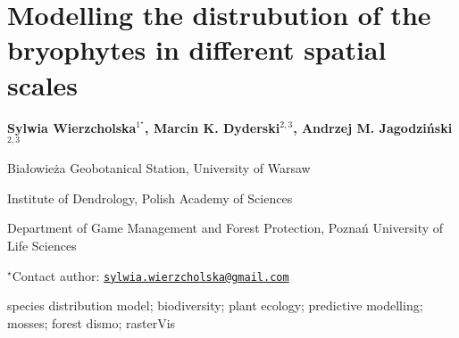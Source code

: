 \documentclass[\main/boa.tex]{subfiles}
\begin{document}
\section{Modelling the distrubution of the bryophytes in different spatial scales}

\begin{center}
  {\bf Sylwia Wierzcholska$^{1^\star}$, Marcin K. Dyderski$^{2, 3}$, Andrzej M. Jagodziński$^{2, 3}$}
\end{center}

\vskip 0.3cm

\begin{affiliations}
\begin{enumerate}
\begin{minipage}{0.915\textwidth}
\centering
\item Białowieża Geobotanical Station, University of Warsaw \\[-2pt]
\item Institute of Dendrology, Polish Academy of Sciences \\[-2pt]
\item Department of Game Management and Forest Protection, Poznań University
of Life Sciences \\[-2pt]
\end{minipage}
\end{enumerate}
$^\star$Contact author: \href{mailto:sylwia.wierzcholska@gmail.com}{\nolinkurl{sylwia.wierzcholska@gmail.com}}\\
\end{affiliations}

\vskip 0.5cm

\begin{minipage}{0.915\textwidth}
\keywords species distribution model; biodiversity; plant ecology; predictive
modelling; mosses; forest
\packages dismo; rasterVis
\end{minipage}

\vskip 0.8cm
\end{document}
